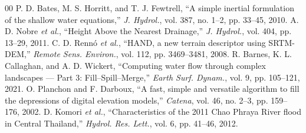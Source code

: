 \documentclass[11pt,a4paper]{article}
\begin{document}
\begin{thebibliography}{00}
 P. D. Bates, M. S. Horritt, and T. J. Fewtrell, ``A simple inertial formulation of the shallow water equations,'' \emph{J. Hydrol.}, vol. 387, no. 1--2, pp. 33--45, 2010.
 A. D. Nobre \emph{et al.}, ``Height Above the Nearest Drainage,'' \emph{J. Hydrol.}, vol. 404, pp. 13--29, 2011.
 C. D. Renn\'o \emph{et al.}, ``HAND, a new terrain descriptor using SRTM-DEM,'' \emph{Remote Sens. Environ.}, vol. 112, pp. 3469--3481, 2008.
 R. Barnes, K. L. Callaghan, and A. D. Wickert, ``Computing water flow through complex landscapes --- Part 3: Fill--Spill--Merge,'' \emph{Earth Surf. Dynam.}, vol. 9, pp. 105--121, 2021.
 O. Planchon and F. Darboux, ``A fast, simple and versatile algorithm to fill the depressions of digital elevation models,'' \emph{Catena}, vol. 46, no. 2--3, pp. 159--176, 2002.
 D. Komori \emph{et al.}, ``Characteristics of the 2011 Chao Phraya River flood in Central Thailand,'' \emph{Hydrol. Res. Lett.}, vol. 6, pp. 41--46, 2012.
\end{thebibliography}
\end{document}
